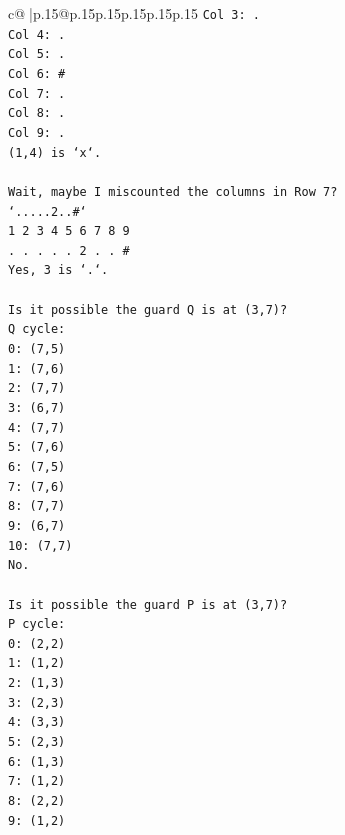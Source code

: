 \documentclass{article}
\begin{document}
{\begin{supertabular}{c@{$\;$}|p{.15\linewidth}@{}p{.15\linewidth}p{.15\linewidth}p{.15\linewidth}p{.15\linewidth}p{.15\linewidth}}
{{{\texttt{Col 3: .} \\
\texttt{Col 4: .} \\
\texttt{Col 5: .} \\
\texttt{Col 6: \#} \\
\texttt{Col 7: .} \\
\texttt{Col 8: .} \\
\texttt{Col 9: .} \\
\texttt{(1,4) is `x`.} \\
\\ 
\texttt{Wait, maybe I miscounted the columns in Row 7?} \\
\texttt{`.....2..\#`} \\
\texttt{1 2 3 4 5 6 7 8 9} \\
\texttt{. . . . . 2 . . \#} \\
\texttt{Yes, 3 is `.`.} \\
\\ 
\texttt{Is it possible the guard Q is at (3,7)?} \\
\texttt{Q cycle:} \\
\texttt{0: (7,5)} \\
\texttt{1: (7,6)} \\
\texttt{2: (7,7)} \\
\texttt{3: (6,7)} \\
\texttt{4: (7,7)} \\
\texttt{5: (7,6)} \\
\texttt{6: (7,5)} \\
\texttt{7: (7,6)} \\
\texttt{8: (7,7)} \\
\texttt{9: (6,7)} \\
\texttt{10: (7,7)} \\
\texttt{No.} \\
\\ 
\texttt{Is it possible the guard P is at (3,7)?} \\
\texttt{P cycle:} \\
\texttt{0: (2,2)} \\
\texttt{1: (1,2)} \\
\texttt{2: (1,3)} \\
\texttt{3: (2,3)} \\
\texttt{4: (3,3)} \\
\texttt{5: (2,3)} \\
\texttt{6: (1,3)} \\
\texttt{7: (1,2)} \\
\texttt{8: (2,2)} \\
\texttt{9: (1,2)} \\
}}}
\end{supertabular}}
\end{document}
